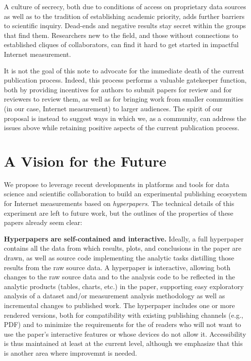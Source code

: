 \documentclass[sigconf]{acmart}
\begin{document}
A culture of secrecy, both due to conditions of access on proprietary data
sources as well as to the tradition of establishing academic priority, adds
further barriers to scientific inquiry. Dead-ends and negative results stay
secret within the groups that find them. Researchers new to the field, and those
without connections to established cliques of collaborators, can find it hard to
get started in impactful Internet measurement. 

It is not the goal of this note to advocate for the immediate death of the
current publication process. Indeed, this process performs a valuable gatekeeper
function, both by providing incentives for authors to submit papers for review
and for reviewers to review them, as well as for bringing work from smaller
communities (in our case, Internet measurement) to larger audiences. The spirit
of our proposal is instead to suggest ways in which we, as a community, can
address the issues above while retaining positive aspects of the current
publication process.

\section{A Vision for the Future}
\label{sec:vision}

We propose to leverage recent developments in platforms and tools for data
science and scientific collaboration to build an experimental publishing
ecosystem for Internet measurements based on {\em hyperpapers}. The technical
details of this experiment are left to future work, but the outlines of the
properties of these papers already seem clear:

\textbf{Hyperpapers are self-contained and interactive.} Ideally, a full
hyperpaper contains all the data from which results, plots, and conclusions in
the paper are drawn, as well as source code implementing the analytic tasks
distilling those results from the raw source data. A hyperpaper is interactive,
allowing both changes to the raw source data and to the analysis code to be
reflected in the analytic products (tables, charts, etc.) in the paper,
supporting easy exploratory analysis of a dataset and/or measurement analysis
methodology as well as incremental changes to published work. The hyperpaper
includes one or more rendered versions, both for compatibility with existing
publishing channels (e.g., PDF) and to minimize the requirements for the of
readers who will not want to use the paper's interactive features or whose
devices do not allow it. Accessibility is thus maintained at least at the
current level, although we emphasize that this is another area where improvemnt
is needed.
\end{document}
